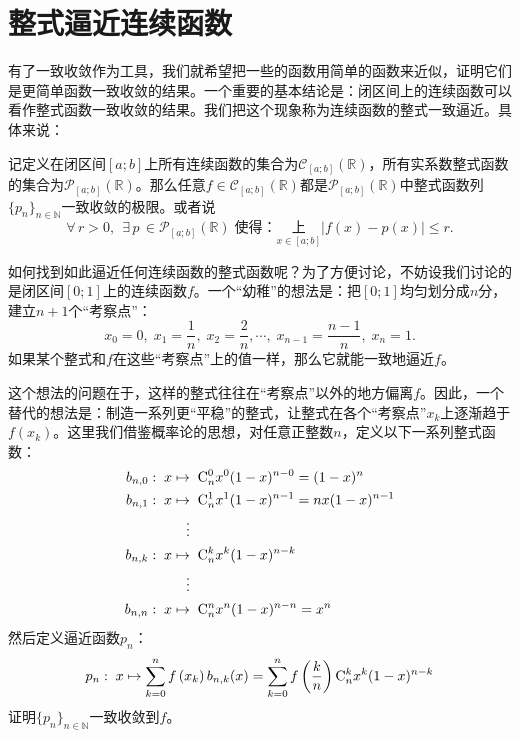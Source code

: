 \documentclass[12pt,UTF8]{ctexbook}
\begin{document}
\section{整式逼近连续函数}
有了一致收敛作为工具，我们就希望把一些的函数用简单的函数来近似，证明它们是更简单函数一致收敛的结果。一个重要的基本结论是：闭区间上的连续函数可以看作整式函数一致收敛的结果。我们把这个现象称为连续函数的整式一致逼近。具体来说：

\begin{tm}
    记定义在闭区间$[a;b]$上所有连续函数的集合为$\mathcal{C}_{[a;b]}(\mathbb{R})$，所有实系数整式函数的集合为$\mathcal{P}_{[a;b]}(\mathbb{R})$。那么任意$f\in\mathcal{C}_{[a;b]}(\mathbb{R})$都是$\mathcal{P}_{[a;b]}(\mathbb{R})$中整式函数列$\{p_n\}_{n\in\mathbb{N}}$一致收敛的极限。或者说
    $$ \forall \, r > 0, \;\, \exists \, p \, \in \mathcal{P}_{[a;b]}(\mathbb{R}) \; \mbox{使得：} \underset{x\in [a;b]}{\text{上}} \left| f(x) - p(x) \right| \leqslant r.$$
\end{tm}

如何找到如此逼近任何连续函数的整式函数呢？为了方便讨论，不妨设我们讨论的是闭区间$[0;1]$上的连续函数$f$。一个“幼稚”的想法是：把$[0;1]$均匀划分成$n$分，建立$n+1$个“考察点”：
$$ x_0 = 0, \; x_1 = \frac{1}{n}, \; x_2 = \frac{2}{n}, \cdots, \; x_{n-1} = \frac{n-1}{n}, \; x_{n} = 1. $$
如果某个整式和$f$在这些“考察点”上的值一样，那么它就能一致地逼近$f$。

这个想法的问题在于，这样的整式往往在“考察点”以外的地方偏离$f$。因此，一个替代的想法是：制造一系列更“平稳”的整式，让整式在各个“考察点”$x_k$上逐渐趋于$f(x_k)$。这里我们借鉴概率论的思想，对任意正整数$n$，定义以下一系列整式函数：
\begin{align*}
    b_{n,0}:\; x &\mapsto \;\mathrm{C}_{n}^{0} x^0(1 - x)^{n-0} = (1 - x)^{n} \\
    b_{n,1}:\; x &\mapsto \;\mathrm{C}_{n}^{1} x^1(1 - x)^{n-1} = nx(1 - x)^{n-1} \\
    &\quad \vdots \\
    b_{n,k}:\; x &\mapsto \;\mathrm{C}_{n}^{k} x^k(1 - x)^{n-k} \\
    &\quad \vdots \\
    b_{n,n}:\; x &\mapsto \;\mathrm{C}_{n}^{n} x^n(1 - x)^{n-n} = x^{n} 
\end{align*}
然后定义逼近函数$p_n$：
\begin{align*}
    p_n: \; x\mapsto \sum_{k=0}^n f\left(x_k\right) b_{n,k}(x) = \sum_{k=0}^n f\left(\frac{k}{n}\right) \mathrm{C}_{n}^{k} x^k(1 - x)^{n-k}
\end{align*}
证明$\{p_n\}_{n\in\mathbb{N}}$一致收敛到$f$。
\end{document}
